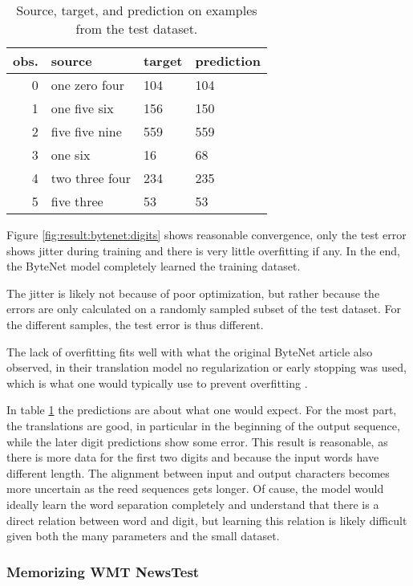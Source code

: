 \begin{table}[h]
\centering
\begin{tabular}{r|p{3.3cm} p{3.3cm} p{3.3cm}}
	obs. & source & target & prediction\\ \hline
  0 & one zero four & 104 & 104 \\
  1 & one five six & 156 & 150 \\
  2 & five five nine & 559 & 559 \\
  3 & one six & 16 & 68 \\
  4 & two three four & 234 & 235 \\
  5 & five three & 53 & 53
\end{tabular}
\caption{Source, target, and prediction on examples from the test dataset.}
\label{table:result:bytenet:digits}
\end{table}

Figure \ref{fig:result:bytenet:digits} shows reasonable convergence, only the test error shows jitter during training and there is very little overfitting if any. In the end, the ByteNet model completely learned the training dataset.

The jitter is likely not because of poor optimization, but rather because the errors are only calculated on a randomly sampled subset of the test dataset. For the different samples, the test error is thus different.

The lack of overfitting fits well with what the original ByteNet article also observed, in their translation model no regularization or early stopping was used, which is what one would typically use to prevent overfitting \cite{bytenet}.

In table \ref{table:result:bytenet:digits} the predictions are about what one would expect. For the most part, the translations are good, in particular in the beginning of the output sequence, while the later digit predictions show some error. This result is reasonable, as there is more data for the first two digits and because the input words have different length. The alignment between input and output characters becomes more uncertain as the reed sequences gets longer. Of cause, the model would ideally learn the word separation completely and understand that there is a direct relation between word and digit, but learning this relation is likely difficult given both the many parameters and the small dataset.

\clearpage
\subsubsection{Memorizing WMT NewsTest}


